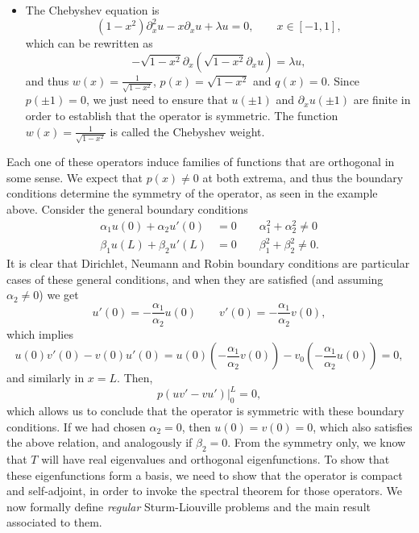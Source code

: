 \begin{itemize}
    \item The Chebyshev equation is 
    \begin{equation*}
        (1-x^2)\partial_x^2 u - x\partial_x u + \lambda u = 0,\qquad x\in[-1,1],
    \end{equation*}
    which can be rewritten as 
    \begin{equation*}
        -\sqrt{1-x^2}\partial_x (\sqrt{1-x^2}\partial_x u) = \lambda u,
    \end{equation*}
    and thus $w(x)=\frac{1}{\sqrt{1-x^2}}$, $p(x)=\sqrt{1-x^2}$ and $q(x)=0$. Since $p(\pm 1) = 0$, we just need to ensure that $u(\pm 1)$ and $\partial_x u(\pm 1)$ are finite in order to establish that the operator is symmetric. The function $w(x)=\frac{1}{\sqrt{1-x^2}}$ is called the Chebyshev weight. 
\end{itemize}
Each one of these operators induce families of functions that are orthogonal in some sense. We expect that $p(x)\neq 0$ at both extrema, and thus the boundary conditions determine the symmetry of the operator, as seen in the example above. Consider the general boundary conditions 
\begin{align*}
    \alpha_1 u(0) + \alpha_2 u'(0)&=0 \qquad \alpha_1^2 + \alpha_2^2 \neq 0\\
    \beta_1 u(L) + \beta_2 u'(L)&=0 \qquad \beta_1^2 + \beta_2^2 \neq 0.
\end{align*}
It is clear that Dirichlet, Neumann and Robin boundary conditions are particular cases of these general conditions, and when they are satisfied (and assuming $\alpha_2\neq 0$) we get 
\begin{equation*}
    u'(0)=-\frac{\alpha_1}{\alpha_2}u(0) \qquad v'(0) = -\frac{\alpha_1}{\alpha_2}v(0),
\end{equation*}
which implies 
\begin{equation*}
    u(0)v'(0)-v(0)u'(0) = u(0) \left(-\frac{\alpha_1}{\alpha_2}v(0)\right) - v_0 \left(-\frac{\alpha_1}{\alpha_2}u(0)\right) = 0,
\end{equation*}
and similarly in $x=L$. Then, 
\begin{equation*}
    \left.p(uv'-vu')\right|_0^L = 0,
\end{equation*}
which allows us to conclude that the operator is symmetric with these boundary conditions. If we had chosen $\alpha_2=0$, then $u(0)=v(0)=0$, which also satisfies the above relation, and analogously if $\beta_2=0$. From the symmetry only, we know that $T$ will have real eigenvalues and orthogonal eigenfunctions. To show that these eigenfunctions form a basis, we need to show that the operator is compact and self-adjoint, in order to invoke the spectral theorem for those operators. We now formally define \textit{regular} Sturm-Liouville problems and the main result associated to them.

